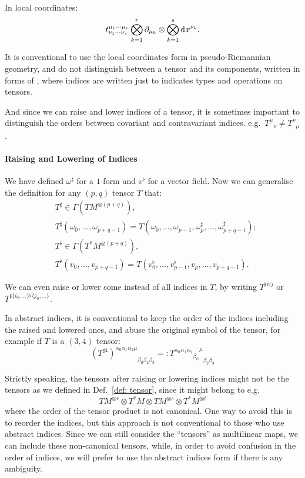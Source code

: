 \documentclass[openany, oneside, a5paper]{book}
\begin{document}
In local coordinates:
\begin{equation}
    t^{\mu_1 \cdots \mu_r}_{\nu_1 \cdots \nu_s} \bigotimes_{k = 1}^r \partial_{\mu_k} \otimes \bigotimes_{k = 1}^s \mathop{}\!\mathrm{d}^{} x^{\nu_k}.
\end{equation}

It is conventional to use the local coordinates form in pseudo-Riemannian geometry, 
and do not distinguish between a tensor and its components, 
written in forms of , 
where indices are written just to indicates types and operations on tensors.

And since we can raise and lower indices of a tensor, it is sometimes important to distinguish the orders between covariant and contravariant indices.
e.g.\ ${T^\mu}_\nu \neq {T^\nu}_\mu$.

\paragraph{Raising and Lowering of Indices}
We have defined $\omega^\sharp$ for a $1$-form and $v^{\flat}$ for a vector field.
Now we can generalise the definition for any $(p, q)$ tensor $T$ that:
\begin{align}
    &T^\sharp \in \Gamma(TM^{\otimes (p + q)}), 
    \\
    &T^\sharp(\omega_0, \ldots, \omega_{p+q-1}) 
    = T(\omega_0, \ldots, \omega_{p-1}, \omega_p^\sharp, \ldots, \omega_{p+q-1}^\sharp); 
    \\
    &T^{\flat} \in \Gamma(T^*M^{\otimes (p + q)}),
    \\
    &T^{\flat}(v_0, \ldots, v_{p+q-1})
    = T(v_0^{\flat}, \ldots, v_{p-1}^{\flat}, v_p, \ldots, v_{p+q-1}).
\end{align}

We can even raise or lower some instead of all indices in $T$, by writing $T^{\sharp i\flat j}$ or $T^{\sharp\{i_0, \ldots\}\flat\{j_0, \ldots\}}$.

In abstract indices, it is conventional to keep the order of the indices including the raised and lowered ones, and abuse the original symbol of the tensor, for example if $T$ is a $(3, 4)$ tensor:
\begin{equation}
    {(T^{\sharp4})^{\alpha_0 \alpha_1 \alpha_2 \mu}}_{\beta_0 \beta_2\beta_3}
    =: {{{T^{\alpha_0 \alpha_1 \alpha_2}}_{\beta_0}}^{\mu}}_{\beta_2\beta_3} 
\end{equation}

Strictly speaking, the tensors after raising or lowering indices might not be the tensors as we defined in Def.~\ref{def: tensor}, since it might belong to e.g.\ 
\begin{equation}
    TM^{\otimes r} \otimes T^*M \otimes TM^{\otimes s} \otimes T^*M^{\otimes t}
\end{equation}
where the order of the tensor product is not canonical.
One way to avoid this is to reorder the indices, but this approach is not conventional to those who use abstract indices.
Since we can still consider the ``tensors'' as multilinear maps, we can include these non-canonical tensors, while, in order to avoid confusion in the order of indices, we will prefer to use the abstract indices form if there is any ambiguity.
\end{document}
